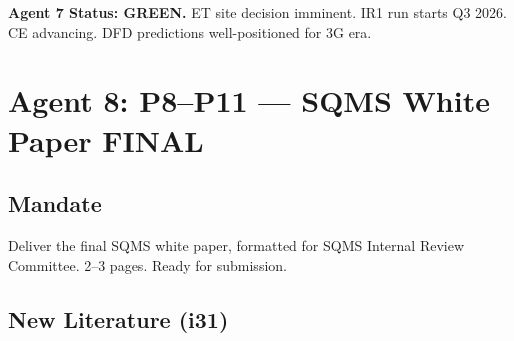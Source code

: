 \documentclass[11pt,a4paper]{article}
\newcommand{\GREEN}{\textcolor{dfdgreen}{\textbf{GREEN}}}
\begin{document}
\textbf{Agent 7 Status: \GREEN.} ET site decision imminent. IR1 run starts Q3 2026. CE advancing. DFD predictions well-positioned for 3G era.

\section{Agent 8: P8--P11 --- SQMS White Paper FINAL}

\subsection{Mandate}
Deliver the final SQMS white paper, formatted for SQMS Internal Review Committee. 2--3 pages. Ready for submission.

\subsection{New Literature (i31)}
\end{document}
